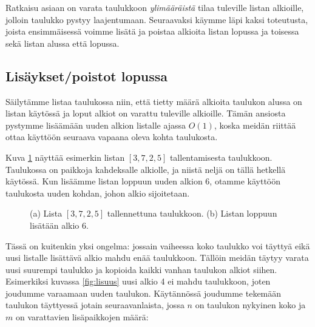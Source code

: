 Ratkaisu asiaan on varata taulukkoon
\emph{ylimääräistä} tilaa tuleville listan alkioille,
jolloin taulukko pystyy laajentumaan.
Seuraavaksi käymme läpi kaksi toteutusta,
joista ensimmäisessä voimme lisätä ja poistaa alkioita
listan lopussa ja toisessa sekä listan alussa että lopussa.

\subsection{Lisäykset/poistot lopussa}

Säilytämme listaa taulukossa niin,
että tietty määrä alkioita taulukon alussa on listan käytössä
ja loput alkiot on varattu tuleville alkioille.
Tämän ansiosta pystymme lisäämään uuden alkion listalle
ajassa $O(1)$, koska meidän riittää ottaa käyttöön seuraava
vapaana oleva kohta taulukosta.

Kuva \ref{fig:listau} näyttää esimerkin listan $[3,7,2,5]$ tallentamisesta taulukkoon.
Taulukossa on paikkoja kahdeksalle alkiolle, ja niistä neljä on tällä hetkellä käytössä.
Kun lisäämme listan loppuun uuden alkion 6, otamme käyttöön taulukosta uuden kohdan,
johon alkio sijoitetaan.

\begin{figure}
\center
{}
\caption{(a) Lista $[3,7,2,5]$ tallennettuna taulukkoon. (b) Listan loppuun lisätään alkio 6.}
\label{fig:listau}
\end{figure}

Tässä on kuitenkin yksi ongelma: jossain vaiheessa koko taulukko
voi täyttyä eikä uusi listalle lisättävä alkio mahdu enää taulukkoon.
Tällöin meidän täytyy varata uusi suurempi taulukko ja
kopioida kaikki vanhan taulukon alkiot siihen.
Esimerkiksi kuvassa \ref{fig:lisuus} uusi alkio 4 ei mahdu taulukkoon,
joten joudumme varaamaan uuden taulukon.
Käytännössä joudumme tekemään taulukon täyttyessä jotain seuraavanlaista,
jossa $n$ on taulukon nykyinen koko ja $m$ on varattavien
lisäpaikkojen määrä:

